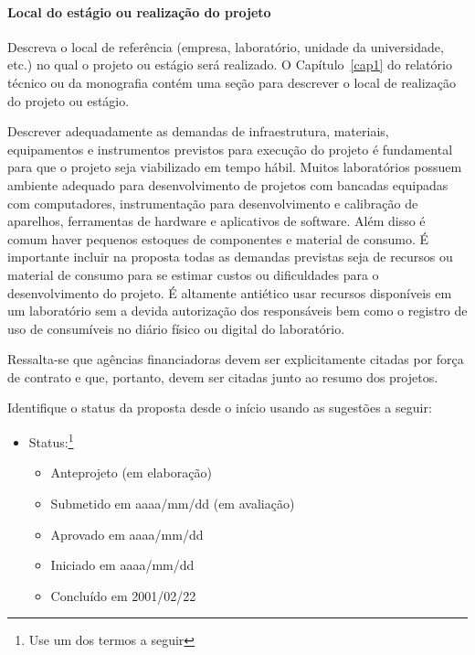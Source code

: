 \paragraph{Local do estágio ou realização do projeto}
Descreva o local de referência (empresa, laboratório, unidade da universidade, etc.) no qual o projeto ou estágio será realizado. O Capítulo~\ref{cap1} do relatório técnico ou da monografia contém uma seção para descrever o local de realização do projeto ou estágio. 

Descrever adequadamente as demandas de infraestrutura, materiais, equipamentos e instrumentos previstos para execução do projeto é fundamental para que o projeto seja viabilizado em tempo hábil. Muitos laboratórios possuem ambiente adequado para desenvolvimento de projetos com bancadas equipadas com computadores, instrumentação para desenvolvimento e calibração de aparelhos, ferramentas de hardware e aplicativos de software. Além disso é comum haver pequenos estoques de componentes e material de consumo. É importante incluir na proposta todas as demandas previstas seja de recursos ou material de consumo para se estimar custos ou dificuldades para o desenvolvimento do projeto. É altamente antiético usar recursos disponíveis em um laboratório sem a devida autorização dos responsáveis bem como o registro de uso de consumíveis no diário físico ou digital do laboratório.

Ressalta-se que agências financiadoras devem ser explicitamente citadas por força de contrato e que, portanto, devem ser citadas junto ao resumo dos projetos.

Identifique o status da proposta desde o início usando as sugestões a seguir:
\begin{itemize}
	\item Status:\footnote{Use um dos termos a seguir}
	\begin{itemize}
		\item    Anteprojeto (em elaboração)
		\item   Submetido em aaaa/mm/dd (em avaliação)
		\item   Aprovado em aaaa/mm/dd
		\item   Iniciado em aaaa/mm/dd
		\item   Concluído em 2001/02/22
	\end{itemize}
\end{itemize}


